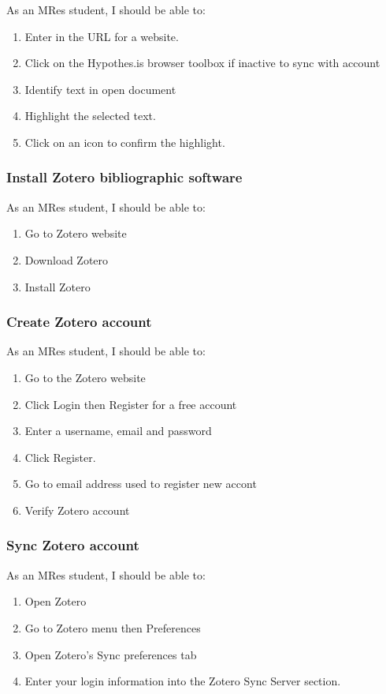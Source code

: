 \documentclass{article}
\begin{document}
As an MRes student, I should be able to: \begin{enumerate}
\item Enter in the URL for a website.
\item Click on the Hypothes.is browser toolbox if inactive to sync with account
\item Identify text in open document
\item Highlight the selected text. 
\item Click on an icon to confirm the highlight.
\end{enumerate}

\subsubsection*{Install Zotero bibliographic software}

As an MRes student, I should be able to:
\begin{enumerate}
\item Go to Zotero website
\item Download Zotero
\item Install Zotero
\end{enumerate}

\subsubsection*{Create Zotero account}

As an MRes student, I should be able to:
\begin{enumerate}
\item Go to the Zotero  website
\item Click Login then Register for a free account
\item Enter a username, email and password 
\item Click Register.
\item Go to email address used to register new accont
\item Verify Zotero account
\end{enumerate}

\subsubsection*{Sync Zotero account}

As an MRes student, I should be able to:
\begin{enumerate}
\item Open Zotero
\item Go to Zotero menu then Preferences
\item Open Zotero's Sync preferences tab 
\item Enter your login information into the Zotero Sync Server section.
\end{enumerate}
\end{document}
